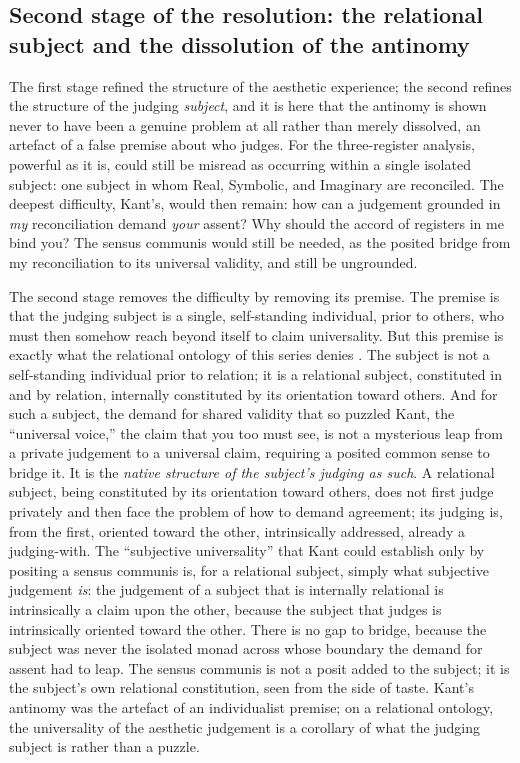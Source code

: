 \subsection{Second stage of the resolution: the relational subject and the dissolution of the antinomy}
\label{p21:sub:ap-relationalsubject}

The first stage refined the structure of the aesthetic experience; the second refines the structure of the judging \emph{subject}, and it is here that the antinomy is shown never to have been a genuine problem at all rather than merely dissolved, an artefact of a false premise about who judges. For the three-register analysis, powerful as it is, could still be misread as occurring within a single isolated subject: one subject in whom Real, Symbolic, and Imaginary are reconciled. The deepest difficulty, Kant's, would then remain: how can a judgement grounded in \emph{my} reconciliation demand \emph{your} assent? Why should the accord of registers in me bind you? The sensus communis would still be needed, as the posited bridge from my reconciliation to its universal validity, and still be ungrounded.

The second stage removes the difficulty by removing its premise. The premise is that the judging subject is a single, self-standing individual, prior to others, who must then somehow reach beyond itself to claim universality. But this premise is exactly what the relational ontology of this series denies \parencite{wan2024grb}. The subject is not a self-standing individual prior to relation; it is a relational subject, constituted in and by relation, internally constituted by its orientation toward others. And for such a subject, the demand for shared validity that so puzzled Kant, the ``universal voice,'' the claim that you too must see, is not a mysterious leap from a private judgement to a universal claim, requiring a posited common sense to bridge it. It is the \emph{native structure of the subject's judging as such}. A relational subject, being constituted by its orientation toward others, does not first judge privately and then face the problem of how to demand agreement; its judging is, from the first, oriented toward the other, intrinsically addressed, already a judging-with. The ``subjective universality'' that Kant could establish only by positing a sensus communis is, for a relational subject, simply what subjective judgement \emph{is}: the judgement of a subject that is internally relational is intrinsically a claim upon the other, because the subject that judges is intrinsically oriented toward the other. There is no gap to bridge, because the subject was never the isolated monad across whose boundary the demand for assent had to leap. The sensus communis is not a posit added to the subject; it is the subject's own relational constitution, seen from the side of taste. Kant's antinomy was the artefact of an individualist premise; on a relational ontology, the universality of the aesthetic judgement is a corollary of what the judging subject is rather than a puzzle.

